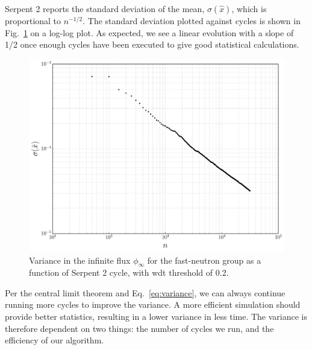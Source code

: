 Serpent 2 reports the standard deviation of the mean,
$\sigma(\hat{x})$, which is proportional to $n^{-1/2}$. The standard deviation
plotted against cycles is shown in Fig.~\ref{fig:error_convergence} on
a log-log plot. As expected, we see a linear evolution with a slope of
1/2 once enough cycles have been executed to give good statistical calculations.
\begin{figure}[hbtp]
  \centering
  \includegraphics[scale=0.5]{images/error_convergence}
  \caption[Variance in $\phi_{\infty}$ for the fast-neutron group as a
  function of Serpent 2 cycle.]{Variance in the infinite flux
    $\phi_{\infty}$ for the fast-neutron group as a function of
    Serpent 2 cycle, with \gls{wdt} threshold of 0.2.}
  \label{fig:error_convergence}
\end{figure}
Per the central limit theorem and Eq.~\eqref{eq:variance}, we can
always continue running more cycles to improve the variance. A more
efficient simulation should provide better statistics, resulting in a
lower variance in less time. The variance is therefore dependent on
two things: the number of cycles we run, and the efficiency of our
algorithm. 


